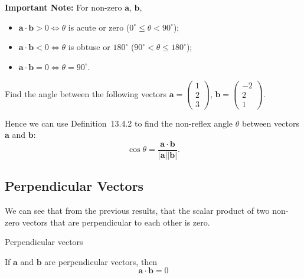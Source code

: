 \documentclass[a4paper]{book}
\newcommand{\cvv}[3]{\begin{pmatrix}#1\\#2\\#3\end{pmatrix}}
\begin{document}
\begin{info}
\textbf{Important Note:} For non-zero $\mathbf a$, $\mathbf b$,
\begin{itemize}
\item $\mathbf a\cdot\mathbf b>0\iff\theta$ is acute or zero ($0^\circ\le\theta<90^\circ$);
\item $\mathbf a\cdot\mathbf b<0\iff\theta$ is obtuse or $180^\circ$ ($90^\circ<\theta\le180^\circ$);
\item $\mathbf a\cdot\mathbf b=0\iff\theta=90^\circ$.
\end{itemize}
\end{info}

\begin{example}
Find the angle between the following vectors $\mathbf a=\cvv{1}{2}{3}$, $\mathbf b=\cvv{-2}{2}{1}$.
\end{example}
\solution{
\[
\begin{aligned}
\mathbf a\cdot\mathbf b&=|\mathbf a||\mathbf b|\cos\theta\\
\cvv{1}{2}{3}\cdot\cvv{-2}{2}{1}&=\left|\cvv{1}{2}{3}\right|\left|\cvv{-2}{2}{1}\right|\cos\theta\\
-2+4+3&=\sqrt{14}\sqrt9\cos\theta\\
\frac{5}{3\sqrt{14}}&=\cos\theta\\
\theta&=\cos^{-1}\left(\frac{5}{3\sqrt{14}}\right)\\
\theta&=63.5^\circ
\end{aligned}
\]}

Hence we can use Definition~13.4.2 to find the non-reflex angle $\theta$ between vectors $\mathbf a$ and $\mathbf b$:
\[
\cos\theta=\frac{\mathbf a\cdot\mathbf b}{|\mathbf a||\mathbf b|}.
\]


\subsection{Perpendicular Vectors}
We can see that from the previous results, that the scalar product of two non-zero vectors that are perpendicular to each other is zero.

\begin{theorem}{Perpendicular vectors}
\begin{center}
\end{center}
\begin{center}
If $\mathbf a$ and $\mathbf b$ are perpendicular vectors, then
\[
\mathbf a\cdot\mathbf b=0
\]
\end{center}
\end{theorem}
\end{document}
